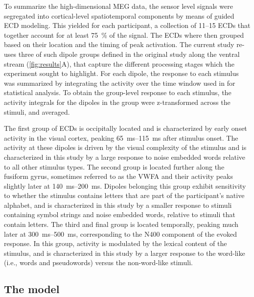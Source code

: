 \documentclass[a4paper, 10pt]{vanvliet_paper}
\begin{document}
To summarize the high-dimensional \gls{MEG} data, the sensor level signals were segregated into cortical-level spatiotemporal components by means of guided \gls{ECD} modeling\cite{Hamalainen1993}.
This yielded for each participant, a collection of 11--15 \glspl{ECD} that together account for at least \SI{75}{\percent} of the signal.
The \glspl{ECD} where then grouped based on their location and the timing of peak activation. 
The current study re-uses three of such dipole groups defined in the original study\cite{Vartiainen2011} along the ventral stream (\autoref{fig:results}A), that capture the different processing stages which the experiment sought to highlight.
For each dipole, the response to each stimulus was summarized by integrating the activity over the time window used in \textcite{Vartiainen2011} for statistical analysis.
To obtain the group-level response to each stimulus, the activity integrals for the dipoles in the group were z-transformed across the stimuli, and averaged.

The first group of \glspl{ECD} is occipitally located and is characterized by early onset activity in the visual cortex, peaking \SIrange{65}{115}{\milli\second} after stimulus onset.
The activity at these dipoles is driven by the visual complexity of the stimulus and is characterized in this study by a large response to noise embedded words relative to all other stimulus types.
The second group is located further along the fusiform gyrus, sometimes referred to as the \gls{VWFA}\cite{Cohen2004} and their activity peaks slightly later at \SIrange{140}{200}{\milli\second}.
Dipoles belonging this group exhibit sensitivity to whether the stimulus contains letters that are part of the participant's native alphabet\cite{Tarkiainen1999}, and is characterized in this study by a smaller response to stimuli containing symbol strings and noise embedded words, relative to stimuli that contain letters.
The third and final group is located temporally, peaking much later at \SIrange{300}{500}{\milli\second}, corresponding to the N400 component of the evoked response\cite{Halgren2002, Helenius1998b, Service2007}.
In this group, activity is modulated by the lexical content of the stimulus, and is characterized in this study by a larger response to the word-like (i.e., words and pseudowords) versus the non-word-like stimuli.

\subsection{The model}
\end{document}
